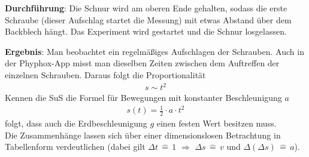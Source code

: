\documentclass[../main.tex]{subfiles}
\begin{document}
\begin{tcolorbox}
    \vspace{-0.5cm}
    \begin{minipage}[]{0.7\textwidth}
        \textbf{Durchführung}:   Die Schnur wird am oberen Ende gehalten, sodass die erste Schraube (dieser Aufschlag startet die Messung) mit etwas Abstand über dem Backblech hängt. Das Experiment wird gestartet und die Schnur losgelassen.

        \vspace{0.5cm}
        \textbf{Ergebnis}: Man beobachtet ein regelmäßiges Aufschlagen der Schrauben. Auch in der Phyphox-App misst man dieselben Zeiten zwischen dem Auftreffen der einzelnen Schrauben. Daraus folgt die Proportionalität
        \begin{align*}
            s \sim t^2
        \end{align*}
        Kennen die SuS die Formel für Bewegungen mit konstanter Beschleunigung $a$
        \begin{align*}
            s(t) = \frac{1}{2} \cdot a \cdot  t^2
        \end{align*}
        folgt, dass auch die Erdbeschleunigung $g$ einen festen Wert besitzen muss.\\
        Die Zusammenhänge lassen sich über einer dimensionslosen Betrachtung in Tabellenform verdeutlichen (dabei gilt $\Delta t \, \widehat{=} \, 1$ $\Rightarrow$ $\Delta s \,\widehat{=}\, v$ und $\Delta(\Delta s)\,\widehat{=}\,a$).
    \end{minipage}
    \hspace{0.2cm}
    \begin{minipage}[]{0.2\textwidth}
        \vspace{1.0cm} 

\end{minipage}
\end{tcolorbox}
\end{document}
